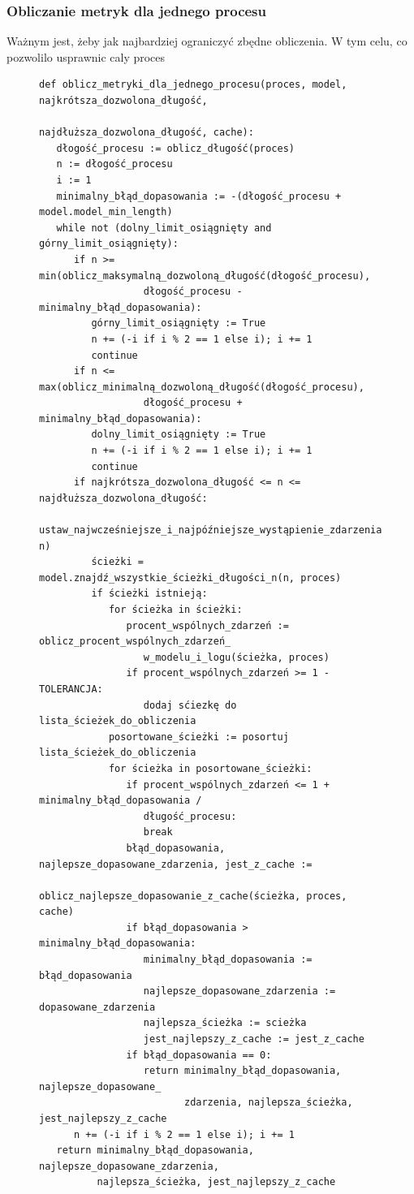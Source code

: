 \subsubsection{Obliczanie metryk dla jednego procesu}
Ważnym jest, żeby jak najbardziej ograniczyć zbędne obliczenia.  W tym celu, co pozwolilo usprawnic caly proces
\begin{figure}[!ht]
\lstset{caption=Obliczanie metryk dla jednego procesu, captionpos=b}
\lstset{label=src:best_result, frame=single}
\begin{lstlisting}
def oblicz_metryki_dla_jednego_procesu(proces, model, najkrótsza_dozwolona_długość, 
				               najdłuższa_dozwolona_długość, cache):
   dłogość_procesu := oblicz_długość(proces)
   n := dłogość_procesu
   i := 1
   minimalny_błąd_dopasowania := -(dłogość_procesu + model.model_min_length)
   while not (dolny_limit_osiągnięty and górny_limit_osiągnięty):
      if n >= min(oblicz_maksymalną_dozwoloną_długość(dłogość_procesu), 
                  dłogość_procesu - minimalny_błąd_dopasowania):
         górny_limit_osiągnięty := True
         n += (-i if i % 2 == 1 else i); i += 1
         continue
      if n <= max(oblicz_minimalną_dozwoloną_długość(dłogość_procesu), 
                  dłogość_procesu + minimalny_błąd_dopasowania):
         dolny_limit_osiągnięty := True
         n += (-i if i % 2 == 1 else i); i += 1
         continue
      if najkrótsza_dozwolona_długość <= n <= najdłuższa_dozwolona_długość:
         ustaw_najwcześniejsze_i_najpóźniejsze_wystąpienie_zdarzenia(model, n)
         ścieżki = model.znajdź_wszystkie_ścieżki_długości_n(n, proces)
         if ścieżki istnieją:
            for ścieżka in ścieżki:
               procent_wspólnych_zdarzeń := oblicz_procent_wspólnych_zdarzeń_
                  w_modelu_i_logu(ścieżka, proces)
               if procent_wspólnych_zdarzeń >= 1 - TOLERANCJA:
                  dodaj sćiezkę do lista_ścieżek_do_obliczenia
            posortowane_ścieżki := posortuj lista_ścieżek_do_obliczenia
            for ścieżka in posortowane_ścieżki:
               if procent_wspólnych_zdarzeń <= 1 + minimalny_błąd_dopasowania /
                  długość_procesu:
                  break
               błąd_dopasowania, najlepsze_dopasowane_zdarzenia, jest_z_cache :=
                  oblicz_najlepsze_dopasowanie_z_cache(ścieżka, proces, cache)
               if błąd_dopasowania > minimalny_błąd_dopasowania:
                  minimalny_błąd_dopasowania := błąd_dopasowania
                  najlepsze_dopasowane_zdarzenia := dopasowane_zdarzenia
                  najlepsza_ścieżka := scieżka
                  jest_najlepszy_z_cache := jest_z_cache
               if błąd_dopasowania == 0:
                  return minimalny_błąd_dopasowania, najlepsze_dopasowane_
                         zdarzenia, najlepsza_ścieżka, jest_najlepszy_z_cache
      n += (-i if i % 2 == 1 else i); i += 1
   return minimalny_błąd_dopasowania, najlepsze_dopasowane_zdarzenia, 
          najlepsza_ścieżka, jest_najlepszy_z_cache
\end{lstlisting}
\end{figure}


